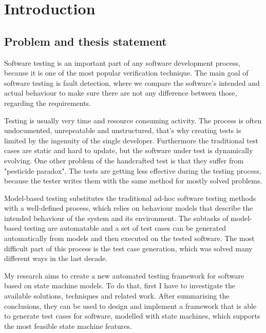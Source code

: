 \chapter*{Introduction}
\label{cha:introduction}

\section*{Problem and thesis statement}
\label{sec:problem}

Software testing is an important part of any software development process, because it is one of the most popular verification technique. The main goal of software testing is fault detection, where we compare the software's intended and actual behaviour to make sure there are not any difference between those, regarding the requirements.

Testing is usually very time and resource consuming activity. The process is often undocumented, unrepeatable and unstructured, that's why creating tests is limited by the ingenuity of the single developer. Furthermore the traditional test cases are static and hard to update, but the software under test is dynamically evolving. One other problem of the handcrafted test is that they suffer from "pesticide paradox". The tests are getting less effective during the testing process, because the tester writes them with the same method for mostly solved problems.

Model-based testing substitutes the traditional ad-hoc software testing methods with a well-defined process, which relies on behaviour models that describe the intended behaviour of the system and its environment. The subtasks of model-based testing are automatable and a set of test cases can be generated automatically from models and then executed on the tested software. The most difficult part of this process is the test case generation, which was solved many different ways in the last decade.

My research aims to create a new automated testing framework for software based on state machine models. To do that, first I have to investigate the available solutions, techniques and related work. After summarising the conclusions, they can be used to design and implement a framework that is able to generate test cases for software, modelled with state machines, which supports the most feasible state machine features.

